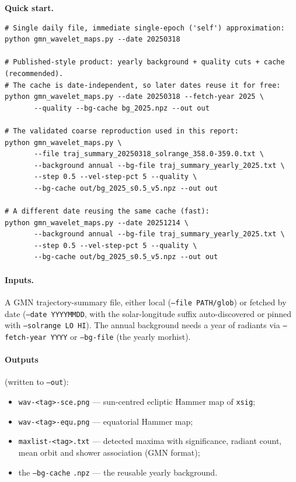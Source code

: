 \documentclass[11pt]{article}
\newcommand{\flag}[1]{\texttt{#1}}
\begin{document}
\medskip
\noindent\textbf{Quick start.}

\begin{lstlisting}
# Single daily file, immediate single-epoch ('self') approximation:
python gmn_wavelet_maps.py --date 20250318

# Published-style product: yearly background + quality cuts + cache (recommended).
# The cache is date-independent, so later dates reuse it for free:
python gmn_wavelet_maps.py --date 20250318 --fetch-year 2025 \
       --quality --bg-cache bg_2025.npz --out out

# The validated coarse reproduction used in this report:
python gmn_wavelet_maps.py \
       --file traj_summary_20250318_solrange_358.0-359.0.txt \
       --background annual --bg-file traj_summary_yearly_2025.txt \
       --step 0.5 --vel-step-pct 5 --quality \
       --bg-cache out/bg_2025_s0.5_v5.npz --out out

# A different date reusing the same cache (fast):
python gmn_wavelet_maps.py --date 20251214 \
       --background annual --bg-file traj_summary_yearly_2025.txt \
       --step 0.5 --vel-step-pct 5 --quality \
       --bg-cache out/bg_2025_s0.5_v5.npz --out out
\end{lstlisting}

\paragraph{Inputs.} A GMN trajectory-summary file, either local
(\flag{--file PATH/glob}) or fetched by date (\flag{--date YYYYMMDD}, with the
solar-longitude suffix auto-discovered or pinned with
\flag{--solrange LO HI}). The annual background needs a year of radiants via
\flag{--fetch-year YYYY} or \flag{--bg-file} (the yearly morhist).

\paragraph{Outputs} (written to \flag{--out}):
\begin{itemize}\itemsep2pt
  \item \texttt{wav-<tag>-sce.png} --- sun-centred ecliptic Hammer map of \texttt{xsig};
  \item \texttt{wav-<tag>-equ.png} --- equatorial Hammer map;
  \item \texttt{maxlist-<tag>.txt} --- detected maxima with significance, radiant
        count, mean orbit and shower association (GMN format);
  \item the \texttt{--bg-cache} \texttt{.npz} --- the reusable yearly background.
\end{itemize}
\end{document}
